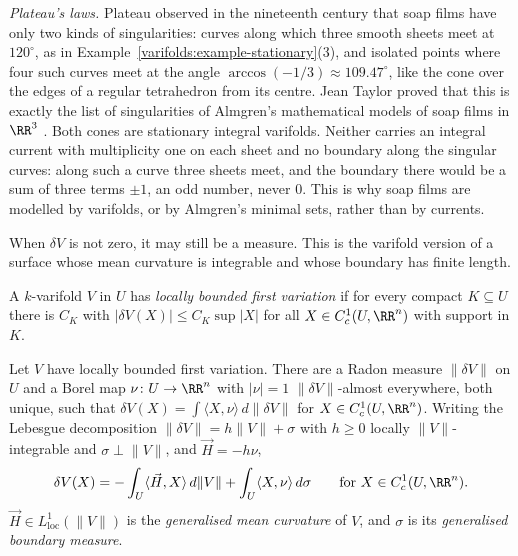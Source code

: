 \begin{remark}\label{varifolds:remark-plateau-laws}
\emph{Plateau's laws.} Plateau observed in the nineteenth century that soap films have only two kinds of singularities: curves along which three smooth sheets meet at $120^\circ$, as in
Example~\ref{varifolds:example-stationary}(3), and isolated points where four such curves meet at the angle $\arccos(-1/3) \approx 109.47^\circ$, like the cone over the edges of a regular tetrahedron from its
centre. Jean Taylor proved that this is exactly the list of singularities of Almgren's mathematical models of soap films in $\RR^3$ \cite{taylor-1976}. Both cones are stationary integral varifolds. Neither carries an
integral current with multiplicity one on each sheet and no boundary along the singular curves: along such a curve three sheets meet, and the boundary there would be a sum of three terms $\pm1$, an odd
number, never $0$. This is why soap films are modelled by varifolds, or by Almgren's minimal sets, rather than by currents.
\end{remark}

When $\delta V$ is not zero, it may still be a measure. This is the varifold version of a surface whose mean curvature is integrable and whose boundary has finite length.

\begin{definition}\label{varifolds:definition-bounded-first-variation}
A $k$-varifold $V$ in $U$ has \emph{locally bounded first variation} if for every compact $K \subseteq U$ there is $C_K$ with $|\delta V(X)| \leq C_K\sup|X|$ for all $X \in C^1_c(U, \RR^n)$ with support in $K$.
\end{definition}

\begin{proposition}\label{varifolds:proposition-generalised-mean-curvature}
Let $V$ have locally bounded first variation. There are a Radon measure $\|\delta V\|$ on $U$ and a Borel map $\nu \colon U \to \RR^n$ with $|\nu| = 1$ $\|\delta V\|$-almost everywhere, both unique, such that
$\delta V(X) = \int\langle X, \nu\rangle\,d\|\delta V\|$ for $X \in C^1_c(U, \RR^n)$. Writing the Lebesgue decomposition $\|\delta V\| = h\|V\| + \sigma$ with $h \geq 0$ locally $\|V\|$-integrable and
$\sigma \perp \|V\|$, and $\vec{H} = -h\nu$,
\[
\delta V(X) = -\int_U\langle\vec{H}, X\rangle\,d\|V\| + \int_U\langle X, \nu\rangle\,d\sigma \qquad\text{for } X \in C^1_c(U, \RR^n).
\]
$\vec{H} \in L^1_{\mathrm{loc}}(\|V\|)$ is the \emph{generalised mean curvature} of $V$, and $\sigma$ is its \emph{generalised boundary measure}.
\end{proposition}

